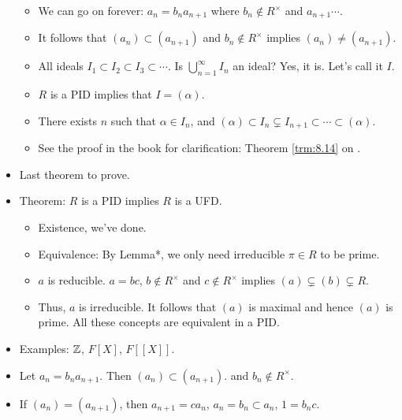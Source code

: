 \documentclass[../notes.tex]{subfiles}
\begin{document}
\begin{itemize}
\begin{itemize}
        \item We can go on forever: $a_n=b_na_{n+1}$ where $b_n\notin R^\times$ and $a_{n+1}\cdots$.
        \item It follows that $(a_n)\subset(a_{n+1})$ and $b_n\notin R^\times$ implies $(a_n)\neq(a_{n+1})$.
        \item All ideals $I_1\subset I_2\subset I_3\subset\cdots$. Is $\bigcup_{n=1}^\infty I_n$ an ideal? Yes, it is. Let's call it $I$.
        \item $R$ is a PID implies that $I=(\alpha)$.
        \item There exists $n$ such that $\alpha\in I_n$, and $(\alpha)\subset I_n\subsetneq I_{n+1}\subset\cdots\subset(\alpha)$.
        \item See the proof in the book for clarification: Theorem \ref{trm:8.14} on \textcite[287-89]{bib:DummitFoote}.
    \end{itemize}
    \item Last theorem to prove.
    \item Theorem: $R$ is a PID implies $R$ is a UFD.
    \begin{itemize}
        \item Existence, we've done.
        \item Equivalence: By Lemma*, we only need irreducible $\pi\in R$ to be prime.
        \item $a$ is reducible. $a=bc$, $b\notin R^\times$ and $c\notin R^\times$ implies $(a)\subsetneq(b)\subsetneq R$.
        \item Thus, $a$ is irreducible. It follows that $(a)$ is maximal and hence $(a)$ is prime. All these concepts are equivalent in a PID.
    \end{itemize}
    \item Examples: $\mathbb{Z}$, $F[X]$, $F[[X]]$.
    \item Let $a_n=b_na_{n+1}$. Then $(a_n)\subset(a_{n+1})$. and $b_n\notin R^\times$.
    \item If $(a_n)=(a_{n+1})$, then $a_{n+1}=ca_n$, $a_n=b_n\subset a_n$, $1=b_nc$.
\end{itemize}
\end{document}
